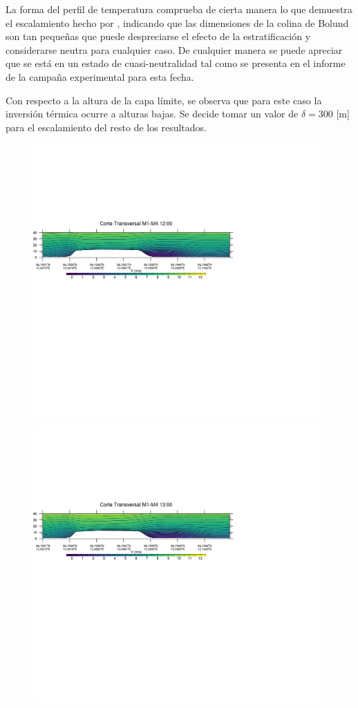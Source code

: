 La forma del perfil de temperatura comprueba de cierta manera lo que demuestra el escalamiento hecho por \cite{3d4285ac04444eb3b9775baf9af052c6}, indicando que las dimensiones de la colina de Bolund son tan pequeñas que puede despreciarse el efecto de la estratificación y considerarse neutra para cualquier caso. De cualquier manera se puede apreciar que se está en un estado de cuasi-neutralidad tal como se presenta en el informe de la campaña experimental para esta fecha.

Con respecto a la altura de la capa límite, se observa que para este caso la inversión térmica ocurre a alturas bajas. Se decide tomar un valor de $\delta = 300$ [m] para el escalamiento del resto de los resultados.
\begin{figure}[H]
	\centering
	\includegraphics[width=0.90\linewidth,trim={0mm 202.0mm 111mm 106mm},clip]{Imagenes/06/bol/1200rot}\\%
	\includegraphics[width=0.90\linewidth,trim={0mm 202.0mm 111mm 106mm},clip]{Imagenes/06/bol/1300rot}\\%

\end{figure}
